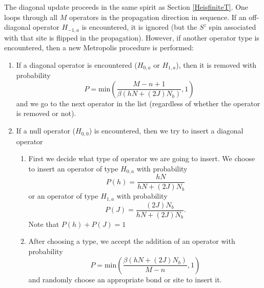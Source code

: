 \documentclass[vecphys]{svmult}
\begin{document}
The diagonal update proceeds in the same spirit as Section \ref{HeisfiniteT}.  One loops through all $M$ operators in the propagation direction in sequence. If an off-diagonal operator $H_{-1,a}$ is encountered, it is ignored (but the $S^z$ spin associated with that site is flipped in the propagation).  However, if another operator type is encountered, then a new Metropolis procedure is performed:
\begin{enumerate}
\item If a diagonal operator is encountered ($H_{0,a}$ or $H_{1,a}$), then it is removed with probability
\begin{equation}
P = \mathrm{min}\left( \frac{M-n+1}{\beta(hN + (2J)N_b)},1\right)
\end{equation}
and we go to the next operator in the list (regardless of whether the operator is removed or not).
\item If a null operator ($H_{0,0}$) is encountered, then we try to insert a diagonal operator
\begin{enumerate}
\item First we decide what type of operator we are going to insert. We choose to insert an operator of type $H_{0,a}$ with probability
\begin{equation}
P(h) = \frac{h N}{hN + (2J)N_b}
\end{equation}
or an operator of type $H_{1,a}$ with probability
\begin{equation}
P(J) = \frac{(2J)N_b}{hN + (2J)N_b} .
\end{equation}
Note that $P(h) + P(J) = 1$
\item After choosing a type, we accept the addition of an operator with probability
\begin{equation}
P = \mathrm{min}\left(\frac{\beta(hN + (2J)N_b)}{M-n},1\right)
\end{equation}
and randomly choose an appropriate bond or site to insert it.

\end{enumerate}
\end{enumerate}
\end{document}
